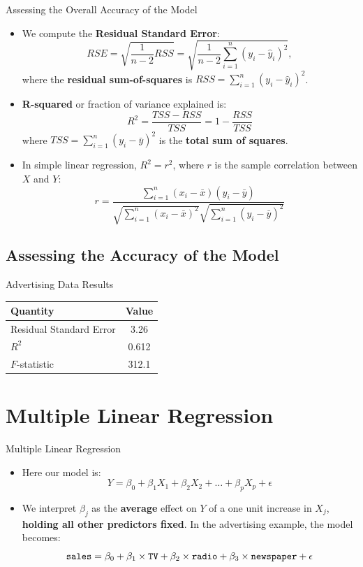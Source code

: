 \documentclass[aspectratio=169, 11pt]{beamer}
\begin{document}
\begin{frame}{Assessing the Overall Accuracy of the Model}
  \begin{itemize}
    \item We compute the \textbf{Residual Standard Error}:
    \[
      RSE = \sqrt{\frac{1}{n-2} RSS} = \sqrt{\frac{1}{n-2} \sum_{i=1}^n (y_i - \hat{y}_i)^2},
    \]
    where the \textbf{residual sum-of-squares} is $RSS=\sum_{i=1}^n (y_i - \hat{y}_i)^2$. \pause
    \item \textbf{R-squared} or fraction of variance explained is:
    \[ R^2 = \frac{TSS - RSS}{TSS} = 1 - \frac{RSS}{TSS} \]
    where $TSS = \sum_{i=1}^n (y_i - \bar{y})^2$ is the \textbf{total sum of squares}. \pause
    \item In simple linear regression, $R^2 = r^2$, where $r$ is the sample correlation between $X$ and $Y$:
    \[ r = \frac{\sum_{i=1}^n (x_i - \bar{x})(y_i - \bar{y})}{\sqrt{\sum_{i=1}^n (x_i - \bar{x})^2} \sqrt{\sum_{i=1}^n (y_i - \bar{y})^2}} \]
  \end{itemize}
\end{frame}

\subsection{Assessing the Accuracy of the Model}

\begin{frame}{Advertising Data Results}
  \begin{table}
    \centering
    \begin{tabular}{l c}
      \toprule
      \textbf{Quantity} & \textbf{Value} \\
      \midrule
      Residual Standard Error & 3.26 \\
      $R^2$                   & 0.612 \\
      $F$-statistic           & 312.1 \\
      \bottomrule
    \end{tabular}
  \end{table}
\end{frame}

\section{Multiple Linear Regression}

\begin{frame}{Multiple Linear Regression}
  \begin{itemize}
    \item Here our model is:
    \[ Y = \beta_0 + \beta_1 X_1 + \beta_2 X_2 + \dots + \beta_p X_p + \epsilon \]
    \item We interpret $\beta_j$ as the \textbf{average} effect on $Y$ of a one unit increase in $X_j$, \textbf{holding all other predictors fixed}. In the advertising example, the model becomes:
    \[ \text{\texttt{sales}} = \beta_0 + \beta_1 \times \text{\texttt{TV}} + \beta_2 \times \text{\texttt{radio}} + \beta_3 \times \text{\texttt{newspaper}} + \epsilon \]
  \end{itemize}
\end{frame}
\end{document}
